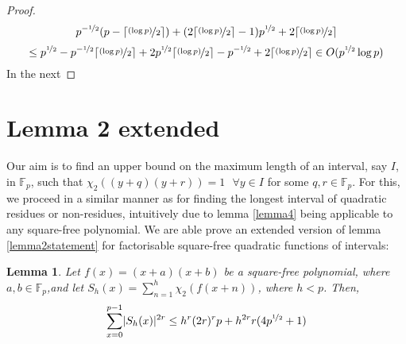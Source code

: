 \documentclass{report}
\newtheorem{lemma}{Lemma}
\begin{document}
\begin{proof}
\[p^{-\nicefrac{1}{2}}(p- \lceil\nicefrac{(\log p)}{2}\rceil)+ (2\lceil\nicefrac{(\log p)}{2}\rceil-1) p^ {\nicefrac {1}{2}} +2\lceil\nicefrac{(\log p)}{2}\rceil\]
\[ \leq p^ {\nicefrac {1}{2}} - p^ {-\nicefrac {1}{2}} \lceil\nicefrac{(\log p)}{2}\rceil + 2p^ {\nicefrac {1}{2}} \lceil\nicefrac{(\log p)}{2}\rceil - p^ {-\nicefrac {1}{2}} + 2\lceil\nicefrac{(\log p)}{2}\rceil \in O(p^{\nicefrac{1}{2}}\log p) \]
In the next %

\end{proof}
%
%
\section{Lemma 2 extended}
%
Our aim is to find an upper bound on the maximum length of an interval, say $I$, in $\mathbb{F}_p$, such that $\chi_2((y+q)(y+r))=1 \text{ }\forall y\in I$ for some $q,r\in \mathbb{F}_p$. For this, we proceed in a similar manner as for finding the longest interval of quadratic residues or non-residues, intuitively due to lemma \ref{lemma4} being applicable to any square-free polynomial. We are able prove an extended version of lemma \ref{lemma2statement} for factorisable square-free quadratic functions of intervals:
%
\begin{lemma} \label{lemma5statement}
Let $f(x)=(x+a)(x+b)$ be a square-free polynomial, where $a,b\in \mathbb{F}_p$,and let $S_h(x)=\sum\limits_{n=1}^{h} \chi_2(f(x+n))$, where $h<p$. Then,
\begin{equation} \label{lemma5}
\sum\limits_{x=0}^{p-1}\lvert S_h(x)\rvert ^{2r}\leq h^{r}(2r)^{r}p+h^{2r}r(4p^{\nicefrac{1}{2}}+1)
\end{equation}
\end{lemma}
\end{document}

